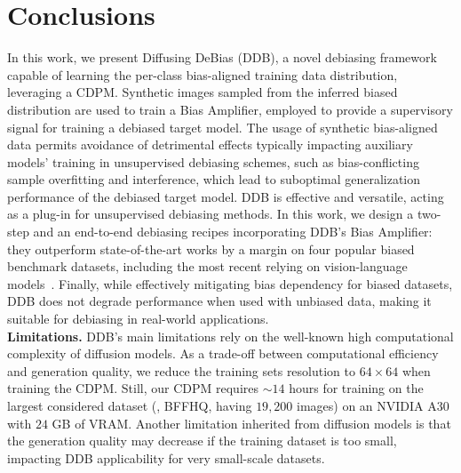 \section{Conclusions}
\label{sec:conclusions}
In this work, we present Diffusing DeBias (DDB), a novel debiasing framework capable of learning the per-class bias-aligned training data distribution, leveraging a CDPM. Synthetic images sampled from the inferred biased distribution are used to train a Bias Amplifier, employed to provide a supervisory signal for training a debiased target model. The usage of synthetic bias-aligned data permits avoidance of detrimental effects typically impacting auxiliary models' training in unsupervised debiasing schemes, such as bias-conflicting sample overfitting and interference, which lead to suboptimal generalization performance of the debiased target model. 
DDB is effective and versatile, acting as a plug-in for unsupervised debiasing methods.
In this work, we design a two-step and an end-to-end debiasing recipes incorporating DDB's Bias Amplifier: they outperform state-of-the-art works by a margin on four popular biased benchmark datasets, including the most recent relying on vision-language models~\cite{kim2024discovering, ciranni2024say}. 
Finally, while effectively mitigating bias dependency for biased datasets, DDB does not degrade performance when used with unbiased data, making it suitable for debiasing in real-world applications.
\vspace{1em}
\\ \noindent \textbf{Limitations.} 
DDB's main limitations rely on the well-known high computational complexity of diffusion models. As a trade-off between computational efficiency and generation quality, we reduce the training sets resolution to $64 \times 64$ when training the CDPM. Still, our CDPM requires $\sim 14$ hours for training on the largest considered dataset (\ie, BFFHQ, having $19,200$ images) on an NVIDIA A30 with $24$ GB of VRAM. 
Another limitation inherited from diffusion models is that the generation quality may decrease if the training dataset is too small, impacting DDB applicability for very small-scale datasets. 